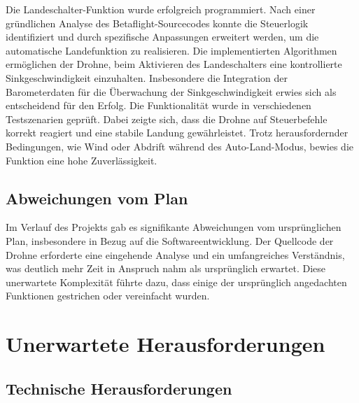 Die Landeschalter-Funktion wurde erfolgreich programmiert. Nach einer gründlichen Analyse des Betaflight-Sourcecodes konnte die Steuerlogik identifiziert und durch spezifische Anpassungen erweitert werden, um die automatische Landefunktion zu realisieren.
Die implementierten Algorithmen ermöglichen der Drohne, beim Aktivieren des Landeschalters eine kontrollierte Sinkgeschwindigkeit einzuhalten. Insbesondere die Integration der Barometerdaten für die Überwachung der Sinkgeschwindigkeit erwies sich als entscheidend für den Erfolg.
Die Funktionalität wurde in verschiedenen Testszenarien geprüft. Dabei zeigte sich, dass die Drohne auf Steuerbefehle korrekt reagiert und eine stabile Landung gewährleistet. Trotz herausfordernder Bedingungen, wie Wind oder Abdrift während des Auto-Land-Modus, bewies die Funktion eine hohe Zuverlässigkeit. 






\subsection{Abweichungen vom Plan}

Im Verlauf des Projekts gab es signifikante Abweichungen vom ursprünglichen Plan, insbesondere in Bezug auf die Softwareentwicklung. Der Quellcode der Drohne erforderte eine eingehende Analyse und ein umfangreiches Verständnis, was deutlich mehr Zeit in Anspruch nahm als ursprünglich erwartet. Diese unerwartete Komplexität führte dazu, dass einige der ursprünglich angedachten Funktionen gestrichen oder vereinfacht wurden.
\section{Unerwartete Herausforderungen}

\subsection{Technische Herausforderungen}

